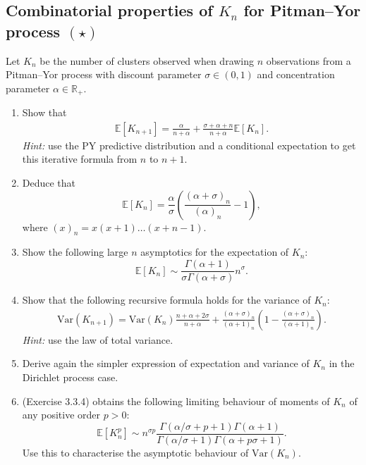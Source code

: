 \documentclass{article}
\begin{document}
 \subsection{Combinatorial properties of $K_n$ for Pitman--Yor process $(\star)$}
\label{ex:K_n-PY}
Let $K_n$ be the number of clusters observed when drawing $n$ observations from a Pitman--Yor process with discount parameter $\sigma\in(0,1)$ and concentration parameter $\alpha\in\mathbb{R}_+$.

\begin{enumerate}
	\item Show that
\begin{align*}
    \mathbb{E}[K_{n+1}]= \frac{\alpha}{n+\alpha} + \frac{\sigma + \alpha +n}{n+ \alpha}\mathbb{E}\left[K_n\right].
\end{align*}
\textit{Hint:} use the PY predictive distribution and a conditional expectation to get this iterative formula from $n$ to $n+1$.
	\item Deduce that
\begin{equation*}
        \mathbb{E}[K_n] = \frac{\alpha}{\sigma}\left(\frac{(\alpha +\sigma)_{n}}{(\alpha)_{n}}-1\right),
\end{equation*}
where $(x)_n = x(x+1)\ldots(x+n-1)$.
	\item Show the following large $n$ asymptotics for the expectation of $K_n$:
\begin{equation*}
        \mathbb{E}[K_n] \sim \frac{\Gamma(\alpha+1)}{\sigma \Gamma(\alpha+\sigma)}n^\sigma.
\end{equation*}
\item Show that the following recursive formula holds for the variance of $K_n$:
\begin{align*}
\mbox{Var}(K_{n+1}) = \mbox{Var}(K_n)\frac{n + \alpha + 2\sigma}{n+\alpha} + \frac{(\alpha +\sigma)_{n}}{(\alpha+1)_{n}}\left(1-\frac{(\alpha +\sigma)_{n}}{(\alpha+1)_{n}}\right).
\end{align*}
\textit{Hint:} use the law of total variance.
\item Derive again the simpler expression of expectation and variance of $K_n$ in the Dirichlet process case.
\item \cite{pitman2002combinatorial} (Exercise 3.3.4) obtains the following limiting behaviour of moments of $K_n$ of any positive order $p>0$:
\begin{equation*}
        \mathbb{E}[K_n^p] \sim n^{\sigma p} \frac{\Gamma(\alpha/\sigma+p+1)\Gamma(\alpha+1)}{\Gamma(\alpha/\sigma+1)\Gamma(\alpha+p\sigma+1)}.
\end{equation*}
Use this to characterise the asymptotic behaviour of $\mbox{Var}(K_n)$.
\end{enumerate}
\end{document}
